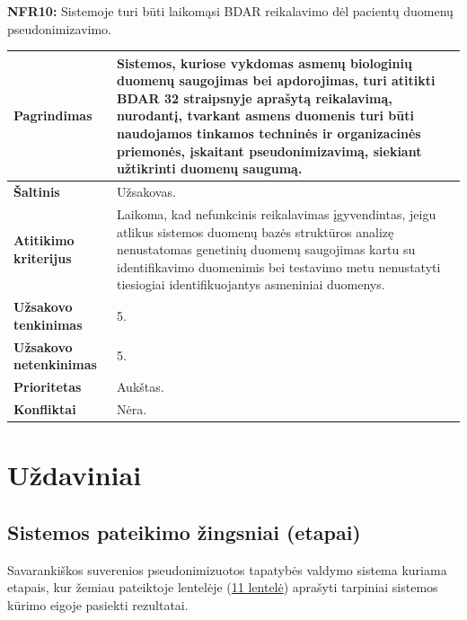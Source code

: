 \documentclass[12pt]{article}
\begin{document}
\noindent \textbf{NFR10:} Sistemoje turi būti laikomąsi BDAR reikalavimo dėl
pacientų duomenų pseudonimizavimo.
\label{sec:NFR10}
\begin{table}[htb!]
    \captionsetup{justification=centering}
    \vskip -10pt
    \begin{tabular}{|m{4.9cm}|m{11cm}|}
        \hline
        \raggedleft \textbf{\cellcolor{deepchampagne}Pagrindimas} &
        Sistemos, kuriose vykdomas asmenų biologinių duomenų saugojimas bei
        apdorojimas, turi atitikti BDAR 32 straipsnyje aprašytą reikalavimą,
        nurodantį, tvarkant asmens duomenis turi būti naudojamos tinkamos
        techninės ir organizacinės priemonės, įskaitant pseudonimizavimą,
        siekiant užtikrinti duomenų saugumą. \\
        \hline
        \raggedleft \textbf{\cellcolor{deepchampagne}Šaltinis} & Užsakovas. \\
        \hline
        \raggedleft \textbf{\cellcolor{deepchampagne}Atitikimo kriterijus} & 
        Laikoma, kad nefunkcinis reikalavimas įgyvendintas, jeigu atlikus
        sistemos duomenų bazės struktūros analizę nenustatomas genetinių duomenų
        saugojimas kartu su identifikavimo duomenimis bei testavimo metu
        nenustatyti tiesiogiai identifikuojantys asmeniniai duomenys. \\
        \hline
        \raggedleft \textbf{\cellcolor{deepchampagne}Užsakovo tenkinimas} & 5. \\
        \hline
        \raggedleft \textbf{\cellcolor{deepchampagne}Užsakovo netenkinimas} & 5. \\
        \hline
        \raggedleft \textbf{\cellcolor{deepchampagne}Prioritetas} & Aukštas. \\
        \hline
        \raggedleft \textbf{\cellcolor{deepchampagne}Konfliktai} & Nėra. \\
        \hline
    \end{tabular}
\end{table}

\newpage

\newpage

\section{Uždaviniai}
\subsection{Sistemos pateikimo žingsniai (etapai)}
Savarankiškos suverenios pseudonimizuotos tapatybės valdymo sistema kuriama
etapais, kur žemiau pateiktoje lentelėje
(\hyperref[sec:PATEIKIMO_ETAPAI]{11 lentelė}) aprašyti tarpiniai sistemos kūrimo
eigoje pasiekti rezultatai.
\end{document}
